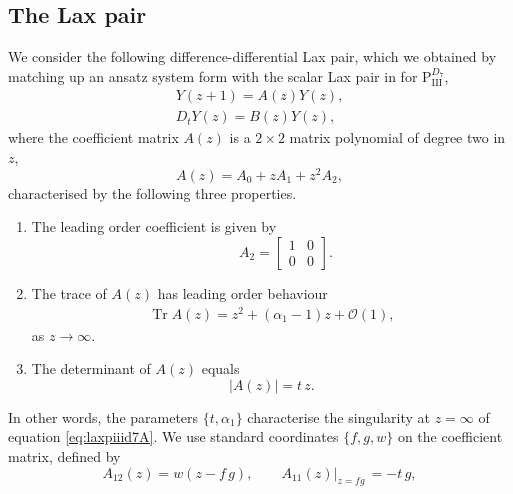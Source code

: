 \documentclass[a4paper,reqno]{amsart}
\numberwithin{equation}{section}
\numberwithin{figure}{section}
\theoremstyle{remark}
\newcommand\Pthree{\textrm{P}_{\textrm{III}}}
\begin{document}
\subsection{The Lax pair} \label{subsect:linP3d7}
We consider the following difference-differential Lax pair, which we obtained by matching up an ansatz system form with the scalar Lax pair in \cite{KNY2017} for $\Pthree^{D_7}$,
\begin{subequations}\label{eq:laxpiiid7}
\begin{align}
    Y(z+1)=A(z)Y(z),\label{eq:laxpiiid7A}\\
    D_t Y(z)=B(z)Y(z),\label{eq:laxpiiid7B}
\end{align}
\end{subequations}
where the coefficient matrix $A(z)$ is a $2\times 2$ matrix polynomial of degree two in $z$,
\begin{equation}\label{eq:piiid7Aseries}
        A(z)=A_0+z A_1+z^2A_2,
    \end{equation}
    characterised by the following three properties.
\begin{enumerate}[label=(\roman*)]
\item The leading order coefficient is given by
\begin{equation*}
    \qquad A_2=\begin{bmatrix}
            1 & 0\\
            0 & 0
        \end{bmatrix}.
\end{equation*}
    \item The trace of $A(z)$ has leading order behaviour
   \begin{equation}\label{eq:traceinfpiiid7}
    \begin{aligned}
     \operatorname{Tr}A(z)=z^2+(\alpha_1-1)z+\mathcal{O}(1),
    \end{aligned}
   \end{equation}
    as $z\rightarrow \infty$.
    \item The determinant of $A(z)$ equals
\begin{equation}\label{eq:coefmatrixdetpiiid7}
    |A(z)|=t\,z.
\end{equation}
\end{enumerate}
In other words, the parameters $\{t,\alpha_1\}$ characterise the singularity at $z=\infty$ of equation \eqref{eq:laxpiiid7A}. We use standard coordinates $\{f,g,w\}$ on the coefficient matrix, defined by 
\begin{equation*}
    A_{12}(z)=w(z-f\,g),\qquad A_{11}(z)|_{z=fg}\,=-t\,g,
\end{equation*}
\end{document}
